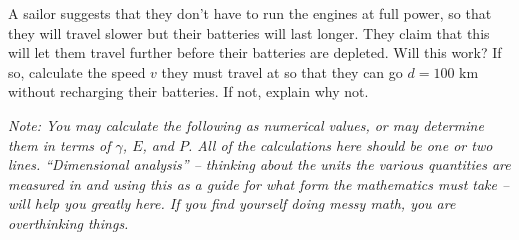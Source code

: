 \documentclass[12pt]{article}
\begin{document}
\begin{enumerate}
\begin{enumerate}
	      A sailor suggests that they don't have to run the engines at full power, so that they will travel slower but their batteries will last longer. They claim that this will let them travel further before their batteries are depleted. Will this work? If so, calculate the speed $v$ they must travel at so that they can go $d=100$ km without recharging their batteries. If not, explain why not.
\end{enumerate}

{\it Note: You may calculate the following as numerical values, or may determine them in terms of $\gamma$, $E$, and $P$. All of the calculations here should be one or two lines. ``Dimensional analysis'' -- thinking about the units the various quantities are measured in and using this as a guide for what form the mathematics must take -- will help you greatly here. If you find yourself doing messy math, you are overthinking things.}


 

\end{enumerate}
\end{document}
